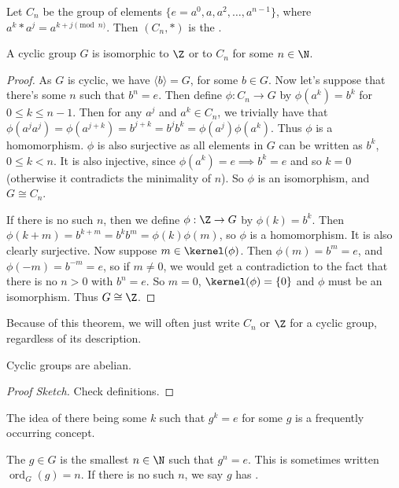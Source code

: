 \documentclass[a4]{scrreprt}
\begin{document}
\begin{definition}
	Let $C_n$ be the group of elements $\{e = a^0, a, a^2, \dots, a^{n - 1}\}$, where $a^k * a^j = a^{k + j \pmod{n}}$. Then $(C_n, *)$ is the .
\end{definition}

\begin{theorem}
	A cyclic group $G$ is isomorphic to $\Z$ or to $C_n$ for some $n \in \N$.
\end{theorem}
\begin{proof}
	As $G$ is cyclic, we have $\langle b \rangle = G$, for some $b \in G$.
	Now let's suppose that there's some $n$ such that $b^n = e$. Then define $\phi: C_n \rightarrow G$ by $\phi(a^k) = b^k$ for $0 \leq k \leq n - 1$.
	Then for any $a^j$ and $a^k \in C_n$, we trivially have that $\phi(a^j a^j) = \phi(a^{j + k}) = b^{j + k} = b^j b^k = \phi(a^j) \phi(a^k)$. Thus $\phi$ is a homomorphism.
	$\phi$ is also surjective as all elements in $G$ can be written as $b^k$, $0 \leq k < n$. It is also injective, since $\phi(a^k) = e \implies b^k = e$ and so $k = 0$ (otherwise it contradicts the minimality of $n$). So $\phi$ is an isomorphism, and $G \cong C_n$.

	If there is no such $n$, then we define $\phi : \Z \rightarrow G$ by $\phi(k) = b^k$. Then $\phi(k + m) = b^{k + m} = b^k b^m = \phi(k) \phi(m)$, so $\phi$ is a homomorphism. It is also clearly surjective.
	Now suppose $m \in \kernel(\phi)$. Then $\phi(m) = b^m = e$, and $\phi(-m) = b^{-m} = e$, so if $m \neq 0$, we would get a contradiction to the fact that there is no $n > 0$ with $b^n = e$. So $m = 0$, $\kernel(\phi) = \{0\}$ and $\phi$ must be an isomorphism. Thus $G \cong \Z$.
\end{proof}

Because of this theorem, we will often just write $C_n$ or $\Z$ for a cyclic group, regardless of its description.

\begin{proposition}
	Cyclic groups are abelian.
\end{proposition}
\begin{proof}[Proof Sketch]
	Check definitions.
\end{proof}

The idea of there being some $k$ such that $g^k = e$ for some $g$ is a frequently occurring concept.

\begin{definition}
	The  $g \in G$ is the smallest $n \in \N$ such that $g^n = e$. This is sometimes written $\operatorname{ord}_G(g) = n$. If there is no such $n$, we say $g$ has .
\end{definition}
\end{document}
